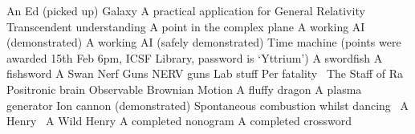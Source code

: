 \begin{multicols}{2}
\begin{small}
\begin{tabbing}
           {An Ed (picked up)}
           {Galaxy}
           {A practical application for General Relativity}
           {Transcendent understanding}
          {A point in the complex plane}
           {A working AI (demonstrated)}
          {A working AI (safely demonstrated)}
        {Time machine (points were awarded 15th Feb 6pm,
        ICSF Library, password is `Yttrium')}
          {A swordfish}
          {A fishsword}
          {A Swan}
           {Nerf Guns}
           {NERV guns}
          {Lab stuff}
         {Per fatality~\E}
          {The Staff of Ra}
           {Positronic brain}
           {Observable Brownian Motion}
           {A fluffy dragon}
           {A plasma generator}
           {Ion cannon (demonstrated)}
         {Spontaneous combustion whilst dancing~\E}
           {A Henry~\E}
          {A Wild Henry}
          {A completed nonogram}
          {A completed crossword}
    \end{tabbing}
  \end{small}
\end{multicols}

\vfill

\begin{center}
\end{center}

\vfill

